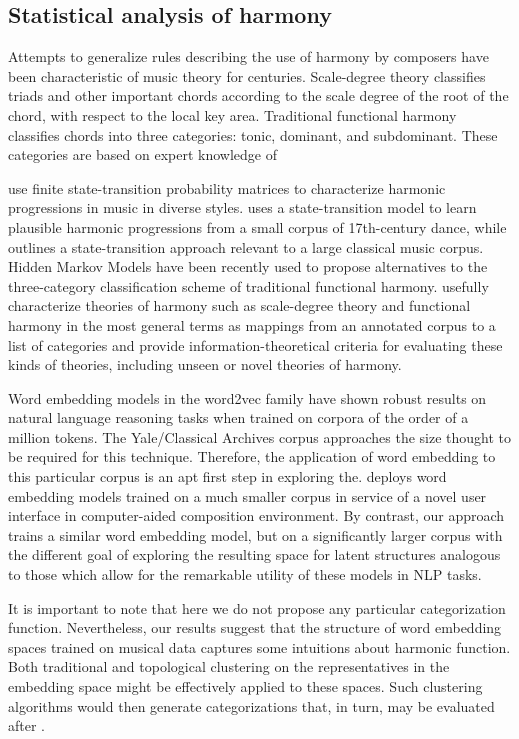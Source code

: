 \subsection{Statistical analysis of harmony}

Attempts to generalize rules describing the use of harmony by composers have been characteristic of music theory for centuries. Scale-degree theory classifies triads and other important chords according to the scale degree of the root of the chord, with respect to the local key area. Traditional functional harmony classifies chords into three categories: tonic, dominant, and subdominant. These categories are based on expert knowledge of 

\cite{nichols_data-driven_2009, temperley_statistical_2013} use finite state-transition probability matrices to characterize harmonic progressions in music in diverse styles. \cite{Ponsford99} uses a state-transition model to learn plausible harmonic progressions from a small corpus of 17th-century dance, while \cite{collins_corpus-sensitive_2015} outlines a state-transition approach relevant to a large classical music corpus. Hidden Markov Models have been recently used to propose alternatives to the three-category classification scheme of traditional functional harmony. \cite{jacoby_information_2015} usefully characterize theories of harmony such as scale-degree theory and functional harmony in the most general terms as mappings from an annotated corpus to a list of categories and provide information-theoretical criteria for evaluating these kinds of theories, including unseen or novel theories of harmony.

Word embedding models in the word2vec family have shown robust results on natural language reasoning tasks when trained on corpora of the order of a million tokens. The Yale/Classical Archives corpus approaches the size thought to be required for this technique. Therefore, the application of word embedding to this particular corpus is an apt first step in exploring the. \cite{Huang2016} deploys word embedding models trained on a much smaller corpus in service of a novel user interface in computer-aided composition environment. By contrast, our approach trains a similar word embedding model, but on a significantly larger corpus with the different goal of exploring the resulting space for latent structures analogous to those which allow for the remarkable utility of these models in NLP tasks. 

It is important to note that here we do not propose any particular categorization function. Nevertheless, our results suggest that the structure of word embedding spaces trained on musical data captures some intuitions about harmonic function. Both traditional and topological clustering on the representatives in the embedding space might be effectively applied to these spaces. Such clustering algorithms would then generate categorizations that, in turn, may be evaluated after \cite{jacoby_information_2015}.

